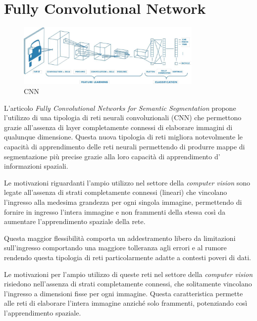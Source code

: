 \section{Fully Convolutional Network}
\begin{figure}[!ht]
	\begin{center}
		\includegraphics[width=0.8\textwidth]{Immagini/cnn.png}
	\end{center}
	\caption{CNN}
	\label{fig:cnn}
\end{figure}



\label{sec:fcn} L'articolo \textit{Fully
	Convolutional Networks for Semantic Segmentation} \cite{long2015fully} propone
l'utilizzo di una tipologia di reti neurali convoluzionali (CNN) che permettono
grazie all'assenza di layer completamente connessi di elaborare immagini di
qualunque dimensione. Questa nuova tipologia di reti migliora notevolmente le capacità di apprendimento delle reti neurali permettendo di produrre mappe
di segmentazione più precise grazie alla loro capacità di apprendimento d' informazioni spaziali.

Le motivazioni riguardanti l'ampio utilizzo nel settore della
\textit{computer vision} sono legate all'assenza di strati completamente
connessi (lineari) che vincolano l'ingresso alla medesima grandezza per ogni
singola immagine, permettendo di fornire in ingresso l'intera immagine e non
frammenti della stessa così da aumentare l'apprendimento spaziale della rete.

Questa maggior flessibilità comporta un addestramento libero da limitazioni
sull'ingresso comportando una maggiore tolleranza agli errori e al rumore
rendendo questa tipologia di reti particolarmente adatte a contesti poveri di
dati.

Le motivazioni per l'ampio utilizzo di queste reti nel settore della \textit{computer vision}
risiedono nell'assenza di strati completamente connessi, che solitamente vincolano l'ingresso a
dimensioni fisse per ogni immagine. Questa caratteristica permette alle reti di elaborare l'intera
immagine anziché solo frammenti, potenziando così l'apprendimento spaziale.

